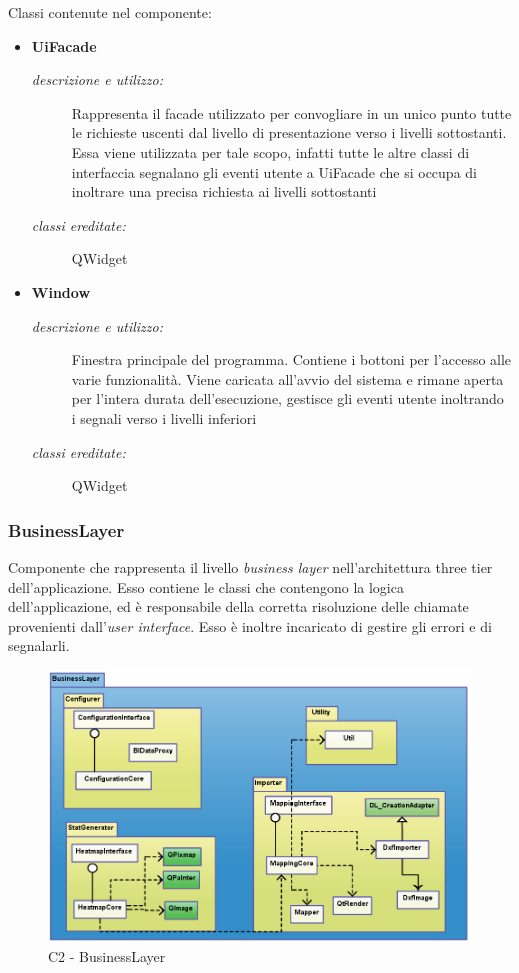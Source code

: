 Classi contenute nel componente: 
\begin{itemize} 
\item \textbf{UiFacade}
\begin{description}
\item [\textit{descrizione e utilizzo:}] Rappresenta il facade utilizzato per convogliare in un unico punto tutte le richieste uscenti dal livello di presentazione verso i livelli sottostanti. Essa viene utilizzata per tale scopo, infatti tutte le altre classi di interfaccia segnalano gli eventi utente a UiFacade che si occupa di inoltrare una precisa richiesta ai livelli sottostanti
\item [\textit{classi ereditate:}] QWidget
\end{description}
\item \textbf{Window}
\begin{description}
\item [\textit{descrizione e utilizzo:}] Finestra principale del programma. Contiene i bottoni per l'accesso alle varie funzionalità. Viene caricata all'avvio del sistema e rimane aperta per l'intera durata dell'esecuzione, gestisce gli eventi utente inoltrando i segnali verso i livelli inferiori
\item [\textit{classi ereditate:}] QWidget
\end{description}
\end{itemize}

\subsubsection{BusinessLayer} \label{sec:c2}
Componente che rappresenta il livello \textit{business layer} nell'architettura three tier dell'applicazione. Esso contiene le classi che contengono la logica dell'applicazione, ed è responsabile della corretta risoluzione delle chiamate provenienti dall'\textit{user interface}. Esso è inoltre incaricato di gestire gli errori e di segnalarli.
\\
\begin{figure}[!h] 

        \centering 

        \includegraphics[scale=0.4]{./images/c2.png} 

        \caption{C2 - BusinessLayer} 

        \label{fig:c2}

        \end{figure} 


